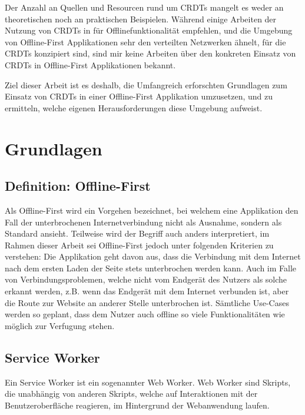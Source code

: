 \documentclass[a4paper, 12pt]{scrreprt}
\begin{document}
Der Anzahl an Quellen und Resourcen rund um CRDTs mangelt es weder an theoretischen noch an praktischen Beispielen. Während einige Arbeiten der Nutzung von CRDTs in für Offlinefunktionalität empfehlen, und die Umgebung von Offline-First Applikationen sehr den verteilten Netzwerken ähnelt, für die CRDTs konzipiert sind, sind mir keine Arbeiten über den konkreten Einsatz von CRDTs in Offline-First Applikationen bekannt.

Ziel dieser Arbeit ist es deshalb, die Umfangreich erforschten Grundlagen zum Einsatz von CRDTs in einer Offline-First Applikation umzusetzen, und zu ermitteln, welche eigenen Herausforderungen diese Umgebung aufweist.
\chapter{Grundlagen}
\section{Definition: Offline-First}\label{sec:DefinitionOfflineFirst}
Als Offline-First wird ein Vorgehen bezeichnet, bei welchem eine Applikation den Fall der unterbrochenen Internetverbindung nicht als Ausnahme, sondern als Standard ansieht. Teilweise wird der Begriff auch anders interpretiert, im Rahmen dieser Arbeit sei Offline-First jedoch unter folgenden Kriterien zu verstehen: Die Applikation geht davon aus, dass die Verbindung mit dem Internet nach dem ersten Laden der Seite stets unterbrochen werden kann. Auch im Falle von Verbindungsproblemen, welche nicht vom Endgerät des Nutzers als solche erkannt werden, z.B. wenn das Endgerät mit dem Internet verbunden ist, aber die Route zur Website an anderer Stelle unterbrochen ist. Sämtliche Use-Cases werden so geplant, dass dem Nutzer auch offline so viele Funktionalitäten wie möglich zur Verfugung stehen.



\section{Service Worker}
Ein Service Worker ist ein sogenannter Web Worker. Web Worker sind Skripts, die unabhängig von anderen Skripts, welche auf Interaktionen mit der Benutzeroberfläche reagieren, im Hintergrund der Webanwendung laufen\autocite{OnlineHTTPWorker}.
\end{document}
